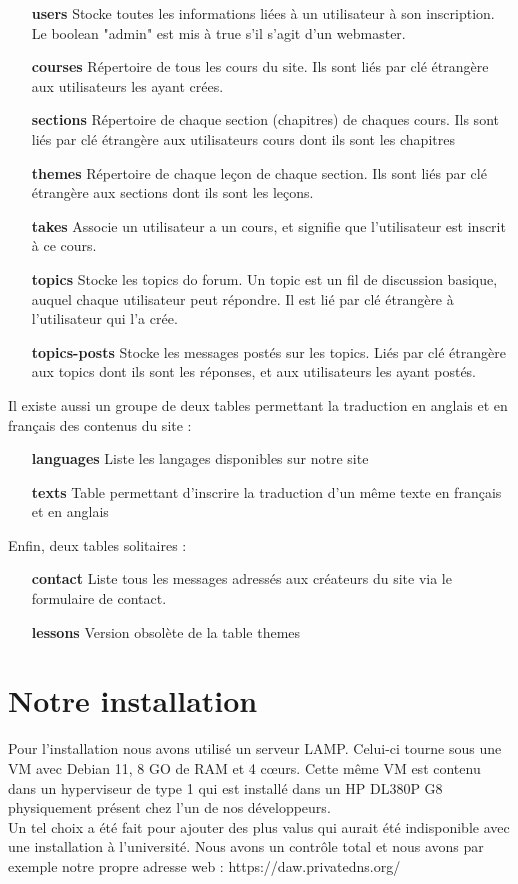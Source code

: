 \documentclass[a4paper,10pt]{article}
\begin{document}
\begin{itemize}
\item[\textbf{users}] Stocke toutes les informations liées à un utilisateur à son inscription. Le boolean "admin" est mis à true s'il s'agit d'un webmaster.
\item[\textbf{courses}] Répertoire de tous les cours du site. Ils sont liés par clé étrangère aux utilisateurs les ayant crées.
\item[\textbf{sections}] Répertoire de chaque section (chapitres) de chaques cours. Ils sont liés par clé étrangère aux utilisateurs cours dont ils sont les chapitres
\item[\textbf{themes}] Répertoire de chaque leçon de chaque section. Ils sont liés par clé étrangère aux sections dont ils sont les leçons.
\item[\textbf{takes}] Associe un utilisateur a un cours, et signifie que l'utilisateur est inscrit à ce cours.
\item[\textbf{topics}] Stocke les topics do forum. Un topic est un fil de discussion basique, auquel chaque utilisateur peut répondre. Il est lié par clé étrangère à l'utilisateur qui l'a crée.
\item[\textbf{topics-posts}] Stocke les messages postés sur les topics. Liés par clé étrangère aux topics dont ils sont les réponses, et aux utilisateurs les ayant postés.
\end{itemize}

Il existe aussi un groupe de deux tables permettant la traduction en anglais et en français des contenus du site : 

\begin{itemize}
\item[\textbf{languages}] Liste les langages disponibles sur notre site
\item[\textbf{texts}] Table permettant d'inscrire la traduction d'un même texte en français et en anglais
\end{itemize}

Enfin, deux tables solitaires :

\begin{itemize}
\item[\textbf{contact}] Liste tous les messages adressés aux créateurs du site via le formulaire de contact.
\item[\textbf{lessons}] Version obsolète de la table themes
\end{itemize}
\newpage

\section{Notre installation}
Pour l'installation nous avons utilisé un serveur LAMP. Celui-ci tourne sous une VM avec Debian 11, 8 GO de RAM et 4 cœurs. Cette même VM est contenu dans un hyperviseur de type 1 qui est installé dans un HP DL380P G8 physiquement présent chez l'un de nos développeurs. \\
Un tel choix a été fait pour ajouter des plus valus qui aurait été indisponible avec une installation à l'université. Nous avons un contrôle total et nous avons par exemple notre propre adresse web : https://daw.privatedns.org/ 
\end{document}
